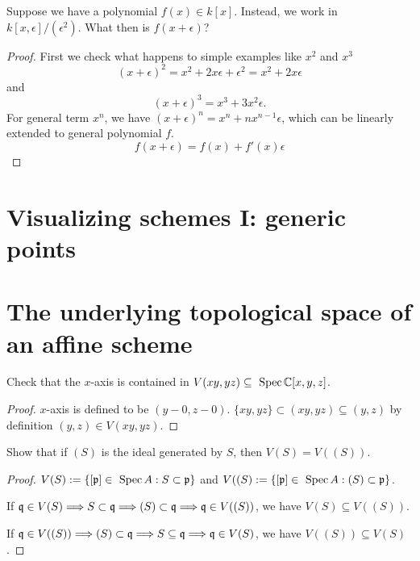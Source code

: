 \begin{exr}
Suppose we have a polynomial $ f(x) \in k[x]$. Instead, we work in $k[x, \epsilon]/(\epsilon^2)$. What then is $f(x + \epsilon)$?
\end{exr}
\begin{proof}
First we check what happens to simple examples like $x^2$ and $x^3$
$$
(x+\epsilon)^2=x^2+2x\epsilon +\epsilon^2=x^2+2x \epsilon
$$
and
$$
(x+\epsilon)^3=x^3+3x^2\epsilon.
$$
For general term $x^n$, we have $(x+\epsilon)^n=x^n+nx^{n-1}\epsilon$, which can be linearly extended to general polynomial $f$.
$$
f(x+\epsilon)=f(x)+f'(x)\epsilon
$$

\end{proof}

\section{Visualizing schemes I: generic points}
\section{The underlying topological space of an affine scheme}
\begin{exr}
Check that the $x$-axis is contained in $V(xy, yz)\subseteq \text{ Spec\,}\mathbb C[x,y,z]$.
\end{exr}
\begin{proof}
$x$-axis is defined to be $(y-0,z-0)$. $\{xy,yz\}\subset (xy,yz)\subseteq (y,z)$ by definition $(y,z)\in V(xy,yz)$.
\end{proof}

\begin{exr}
Show that if $(S)$ is the ideal generated by $S$, then $V(S) =
V ((S))$.
\end{exr}
\begin{proof}
$V(S):=\{[{\mathfrak p}]\in \text{ Spec\,} A: S\subset{\mathfrak p}\}$ and $V((S):=\{[{\mathfrak p}]\in \text{ Spec\,} A: (S)\subset{\mathfrak p}\}$.

 If $\mathfrak q\in V(S)\Longrightarrow S\subset\mathfrak q\Longrightarrow (S)\subset\mathfrak q\Longrightarrow \mathfrak q\in V((S))$, we have $V(S)\subseteq V((S))$.

 If $\mathfrak q\in V((S))\Longrightarrow (S)\subset\mathfrak q\Longrightarrow S\subseteq \mathfrak q\Longrightarrow \mathfrak q\in V(S)$, we have $V((S))\subseteq V(S)$.
\end{proof}

